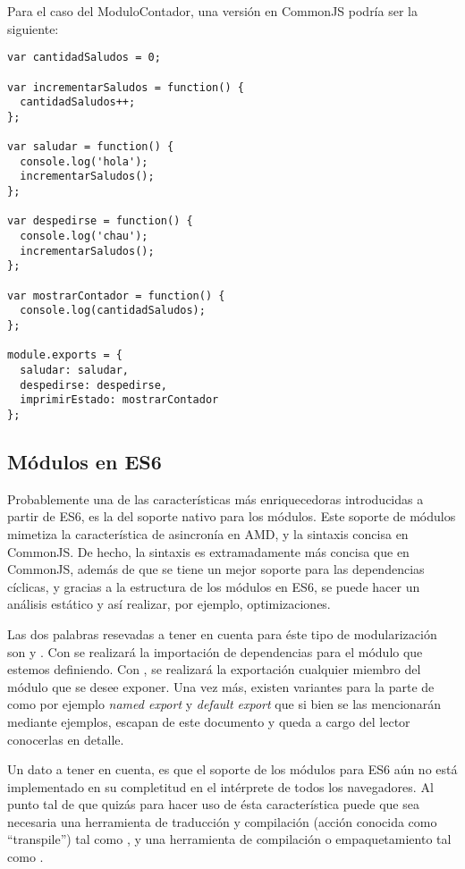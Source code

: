 Para el caso del ModuloContador, una versión en CommonJS podría ser la siguiente:

\begin{lstlisting}[title={Modulo contador en CommonJS}]
var cantidadSaludos = 0;

var incrementarSaludos = function() {
  cantidadSaludos++;
};

var saludar = function() {
  console.log('hola');
  incrementarSaludos();
};

var despedirse = function() {
  console.log('chau');
  incrementarSaludos();
};

var mostrarContador = function() {
  console.log(cantidadSaludos);
};

module.exports = {
  saludar: saludar,
  despedirse: despedirse,
  imprimirEstado: mostrarContador
};
\end{lstlisting}

\subsection{Módulos	en ES6}

Probablemente una de las características más enriquecedoras introducidas a partir de ES6, es la del soporte nativo para los módulos. Este soporte de módulos mimetiza la característica de asincronía en AMD, y la sintaxis concisa en CommonJS. De hecho, la sintaxis es extramadamente más concisa que en CommonJS, además de que se tiene un mejor soporte para las dependencias cíclicas, y gracias a la estructura de los módulos en ES6, se puede hacer un análisis estático y así realizar, por ejemplo, optimizaciones.

Las dos palabras resevadas a tener en cuenta para éste tipo de modularización son  y . Con  se realizará la importación de dependencias para el módulo que estemos definiendo. Con , se realizará la exportación cualquier miembro del módulo que se desee exponer. Una vez más, existen variantes para la parte de  como por ejemplo \textit{named export} y \textit{default export} que si bien se las mencionarán mediante ejemplos, escapan de este documento y queda a cargo del lector conocerlas en detalle.

Un dato a tener en cuenta, es que el soporte de los módulos para ES6 aún no está implementado en su completitud en el intérprete de todos los navegadores. Al punto tal de que quizás para hacer uso de ésta característica puede que sea necesaria una herramienta de traducción y compilación (acción conocida como "`transpile"') tal como , y una herramienta de compilación o empaquetamiento tal como .

